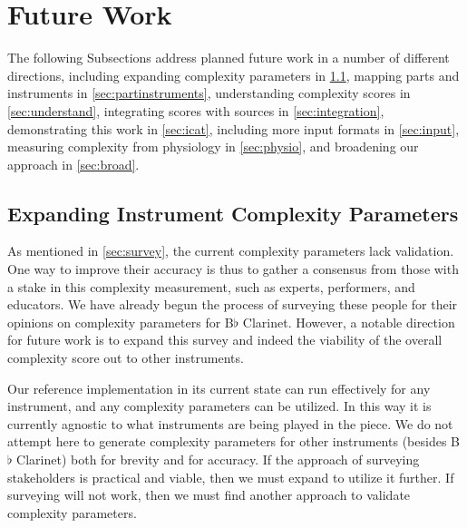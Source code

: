 \documentclass[12pt]{report}
\begin{document}
\chapter{Future Work} 
\label{sec:future}

The following Subsections address planned future work in a number of different directions, including expanding complexity parameters in \ref{sec:parameters}, mapping parts and instruments in \ref{sec:partinstruments}, understanding complexity scores in \ref{sec:understand}, integrating scores with sources in \ref{sec:integration}, demonstrating this work in \ref{sec:icat},
including more input formats in \ref{sec:input}, measuring complexity from physiology in \ref{sec:physio}, and broadening our approach in \ref{sec:broad}.



\section{Expanding Instrument Complexity Parameters}
\label{sec:parameters}

As mentioned in \ref{sec:survey}, the current complexity parameters lack validation. One way to improve their accuracy is thus to gather a consensus from those with a stake in this complexity measurement, such as experts, performers, and educators. We have already begun the process of surveying these people for their opinions on complexity parameters for B$\flat$ Clarinet. However, a notable direction for future work is to expand this survey and indeed the viability of the overall complexity score out to other instruments.

Our reference implementation in its current state can run effectively for any instrument, and any complexity parameters can be utilized. In this way it is currently agnostic to what instruments are being played in the piece. We do not attempt here to generate complexity parameters for other instruments (besides B$\flat$ Clarinet) both for brevity and for accuracy. If the approach of surveying stakeholders is practical and viable, then we must expand to utilize it further. If surveying will not work, then we must find another approach to validate complexity parameters.
\end{document}
